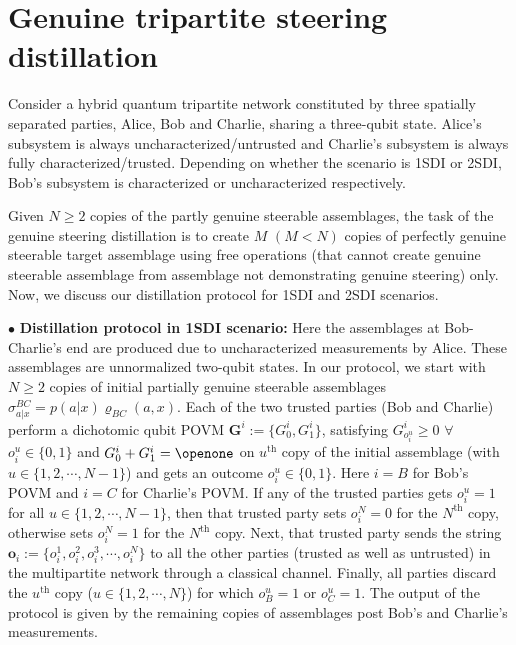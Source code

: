 \documentclass[reprint,superscriptaddress,nofootinbib,amsmath,amssymb,aps,pra,longbibliography]{revtex4-1}
\begin{document}

\section{Genuine tripartite steering distillation}\label{section3}

Consider a hybrid quantum tripartite network constituted by three spatially separated parties, Alice, Bob and Charlie, sharing a three-qubit state. Alice's subsystem is always uncharacterized/untrusted and Charlie's subsystem is always fully characterized/trusted. Depending on whether the scenario is 1SDI or 2SDI, Bob's subsystem is characterized or uncharacterized respectively. 

Given $N \geq 2$ copies of the partly genuine steerable assemblages, the task of the genuine steering distillation is to create $M$ $(M < N )$ copies of perfectly genuine steerable target assemblage using free operations (that cannot create genuine steerable assemblage from assemblage not demonstrating genuine steering) only. Now, we  discuss our distillation protocol for 1SDI and 2SDI scenarios.

$\bullet$ {\bf Distillation protocol in 1SDI scenario:}  Here the assemblages at Bob-Charlie's end are produced due to uncharacterized measurements by Alice. These assemblages are unnormalized two-qubit states. In our protocol, we start with $N \geq 2$ copies of initial partially genuine steerable assemblages $\sigma_{a|x}^{BC} =p(a|x)\varrho_{BC}(a, x)$. Each of the two trusted parties (Bob and Charlie) perform a dichotomic qubit POVM  $\textbf{G}^{i}:=\{G_{0}^{i},G_{1}^{i}\}$, satisfying $G_{o^u_i}^{i} \ge 0$ $\forall$ $o^u_i \in \{0,1\}$ and $G_0^{i} + G_1^{i} = \openone$ on $u^{\text{th}}$ copy of the initial assemblage (with $u \in \{1, 2, \cdots, N-1\}$) and gets an outcome $o^u_i \in \{ 0, 1\}$. Here $i=B$ for Bob's POVM and $i=C$ for Charlie's POVM. If any of the trusted parties gets $o^u_i=1$ for all $u \in \{1, 2, \cdots, N-1\}$, then that trusted party sets $o^N_i=0$ for the $N^{\text{th}}$ copy, otherwise sets $o^N_i=1$ for the $N^{\text{th}}$ copy. Next, that trusted party sends the string $\textbf{o}_{i}:=\{o^1_i, o^2_i, o^3_i, \cdots, o^{N}_i\}$ to all the other parties (trusted as well as untrusted) in the multipartite network through a classical channel. Finally, all parties discard the $u^{\text{th}}$ copy ($u \in \{1, 2, \cdots, N\}$) for which $o^u_B=1$ or $o^u_C=1$. The output of the protocol is given by the remaining  copies of assemblages post Bob's and Charlie's measurements.%
\end{document}
